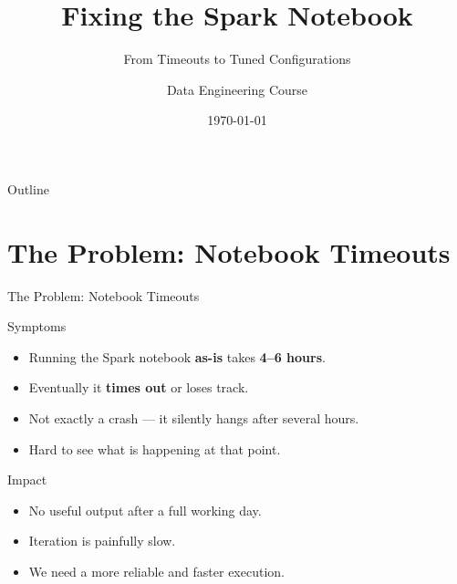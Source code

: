 \documentclass[aspectratio=169]{beamer}
\title{Fixing the Spark Notebook}
\subtitle{From Timeouts to Tuned Configurations}
\author{Data Engineering Course}
\date{\today}
\begin{document}
	
	\begin{frame}
		\titlepage
	\end{frame}
	
	\begin{frame}{Outline}
		\tableofcontents
	\end{frame}
	
	\section{The Problem: Notebook Timeouts}
	
	\begin{frame}{The Problem: Notebook Timeouts}
		\begin{block}{Symptoms}
			\begin{itemize}
				\item Running the Spark notebook \textbf{as-is} takes \textbf{4--6 hours}.
				\item Eventually it \textbf{times out} or loses track.
				\item Not exactly a crash --- it silently hangs after several hours.
				\item Hard to see what is happening at that point.
			\end{itemize}
		\end{block}
		
		\begin{alertblock}{Impact}
			\begin{itemize}
				\item No useful output after a full working day.
				\item Iteration is painfully slow.
				\item We need a more reliable and faster execution.
			\end{itemize}
		\end{alertblock}
	\end{frame}
	
\end{document}
